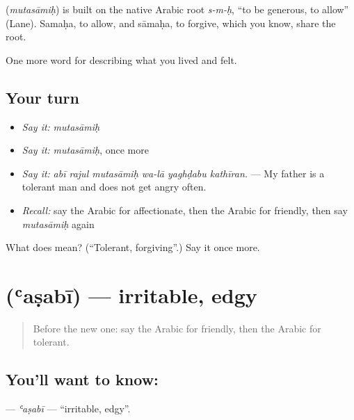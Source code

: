 \begin{cousinweb}
\textbf{} (\emph{mutasāmiḥ}) is built on the native Arabic root \emph{s-m-ḥ}, \textquotedblleft{}to be generous, to allow\textquotedblright{} (Lane). Samaḥa, to allow, and sāmaḥa, to forgive, which you know, share the root.
\end{cousinweb}

\begin{grammarlens}[title={What you've built}]
One more word for describing what you lived and felt.
\end{grammarlens}

\subsection*{Your turn}
\begin{itemize}
\raggedright
  \item \emph{Say it:} \emph{mutasāmiḥ}
  \item \emph{Say it:} \emph{mutasāmiḥ}, once more
  \item \emph{Say it:} \emph{abī rajul mutasāmiḥ wa-lā yaghḍabu kathīran.} — My father is a tolerant man and does not get angry often.
  \item \emph{Recall:} say the Arabic for affectionate, then the Arabic for friendly, then say \emph{mutasāmiḥ} again
\end{itemize}

\begin{tcolorbox}[breakable,colback=teal!4,colframe=teal!35!black,title={Before you move on}]
What does  mean? (\textquotedblleft{}Tolerant, forgiving\textquotedblright{}.) Say it once more.
\end{tcolorbox}
\section[\texorpdfstring{\ar{عصبي} (ʿaṣabī)}{عصبي (ʿaṣabī)}]{ (ʿaṣabī) — irritable, edgy}

\label{lesson:AR-C503-asabi}



\begin{quote}
Before the new one: say the Arabic for friendly, then the Arabic for tolerant.
\end{quote}

\subsection*{You'll want to know: }
\textbf{} — \emph{ʿaṣabī} — \textquotedblleft{}irritable, edgy\textquotedblright{}.


